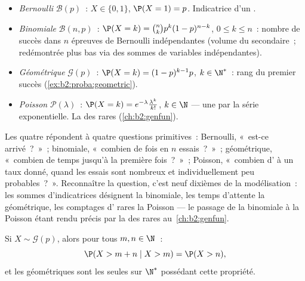 \begin{example}\label{ex:b2:randomvar:laws}
\leavevmode
\begin{itemize}
\item \emph{Bernoulli} $\mathcal{B}(p)$~: $X \in \{0, 1\}$, $\P(X =
1) = p$. Indicatrice d'un .
\item \emph{Binomiale} $\mathcal{B}(n, p)$~: $\P(X = k) =
\binom nk p^k(1-p)^{n-k}$, $0 \leq k \leq n$~: nombre de succès
dans $n$ épreuves de Bernoulli indépendantes (volume du secondaire~;
redémontrée plus bas via des sommes de variables indépendantes).
\item \emph{Géométrique} $\mathcal{G}(p)$~: $\P(X = k) =
(1-p)^{k-1}p$, $k \in \N^*$~: rang du premier succès
(\cref{ex:b2:proba:geometric}).
\item \emph{Poisson} $\mathcal{P}(\lambda)$~: $\P(X = k) =
e^{-\lambda}\frac{\lambda^k}{k!}$, $k \in \N$ --- une  par la série exponentielle. La  des 
rares (\cref{ch:b2:genfun}).
\end{itemize}
\end{example}

\begin{remark}
Les quatre  répondent à quatre questions primitives~: Bernoulli,
«~est-ce arrivé~?~»~; binomiale, «~combien de fois en $n$
essais~?~»~; géométrique, «~combien de temps jusqu'à la première
fois~?~»~; Poisson, «~combien d' à un taux donné, quand les
essais sont nombreux et individuellement peu probables~?~».
Reconnaître la question, c'est neuf dixièmes de la modélisation~: les
sommes d'indicatrices désignent la binomiale, les temps d'attente la
géométrique, les comptages d' rares la Poisson --- le
passage de la binomiale à la Poisson étant rendu précis par la 
des  rares au~\cref{ch:b2:genfun}.
\end{remark}

\begin{proposition}\label{prop:b2:randomvar:memoryless}
Si $X \sim \mathcal{G}(p)$, alors pour tous $m, n \in \N$~:
\[
\P(X > m + n \mid X > m) = \P(X > n) ,
\]
et les  géométriques sont les seules  sur $\N^*$ possédant
cette propriété.
\end{proposition}

